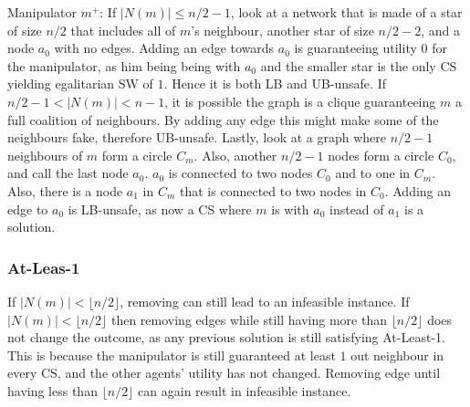 Manipulator $m^+$:
If $|N(m)| \leq n/2 -1 $, look at a network that is made of a star of size $n/2$ that includes all of $m$'s neighbour, another star of size $n/2-2$, and a node $a_0$ with no edges. Adding an edge towards $a_0$ is guaranteeing utility $0$ for the manipulator, as him being  being with $a_0$ and the smaller star is the only CS yielding egalitarian SW of $1$. Hence it is both LB and UB-unsafe.
If $n/2-1 < |N(m)| < n-1$, it is possible the graph is a clique guaranteeing $m$ a full coalition of neighbours. By adding any edge this might make some of the neighbours fake, therefore UB-unsafe. Lastly, look at a graph where $n/2 -1$ neighbours of $m$ form a circle $C_m$. Also, another $n/2-1$ nodes form a circle $C_0$, and call the last node $a_0$. $a_0$ is connected to two nodes $C_0$ and to one in $C_m$. Also, there is a node $a_1$ in $C_m$ that is connected to two nodes in $C_0$. Adding an edge to $a_0$ is LB-unsafe, as now a CS where $m$ is with $a_0$ instead of $a_1$ is a solution.

\subsubsection*{At-Leas-1}
If $|N(m)|<\lfloor n/2 \rfloor$, removing can still lead to an infeasible instance. If $|N(m)|<\lfloor n/2 \rfloor$ then removing edges while still having more than $\lfloor n/2 \rfloor$ does not change the outcome, as any previous solution is still satisfying At-Least-1. This is because the manipulator is still guaranteed at least $1$ out neighbour in every CS, and the other agents' utility has not changed. Removing edge until having less than $\lfloor n/2 \rfloor$ can again result in infeasible instance.

